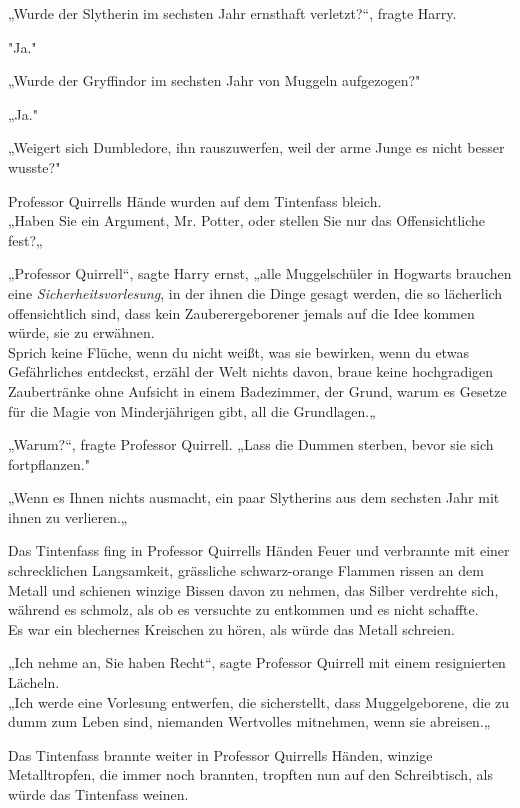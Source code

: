 {„Wurde der Slytherin im sechsten Jahr ernsthaft verletzt?“, fragte Harry.

"Ja."

„Wurde der Gryffindor im sechsten Jahr von Muggeln aufgezogen?"

„Ja."

„Weigert sich Dumbledore, ihn rauszuwerfen, weil der arme Junge es nicht besser wusste?"

Professor Quirrells Hände wurden auf dem Tintenfass bleich.\\ „Haben Sie ein Argument, Mr. Potter, oder stellen Sie nur das Offensichtliche fest?„

„Professor Quirrell“, sagte Harry ernst, „alle Muggelschüler in Hogwarts brauchen eine \emph{Sicherheitsvorlesung}, in der ihnen die Dinge gesagt werden, die so lächerlich offensichtlich sind, dass kein Zauberergeborener jemals auf die Idee kommen würde, sie zu erwähnen.\\ Sprich keine Flüche, wenn du nicht weißt, was sie bewirken, wenn du etwas Gefährliches entdeckst, erzähl der Welt nichts davon, braue keine hochgradigen Zaubertränke ohne Aufsicht in einem Badezimmer, der Grund, warum es Gesetze für die Magie von Minderjährigen gibt, all die Grundlagen.„

„Warum?“, fragte Professor Quirrell. „Lass die Dummen sterben, bevor sie sich fortpflanzen."

„Wenn es Ihnen nichts ausmacht, ein paar Slytherins aus dem sechsten Jahr mit ihnen zu verlieren.„

Das Tintenfass fing in Professor Quirrells Händen Feuer und verbrannte mit einer schrecklichen Langsamkeit, grässliche schwarz-orange Flammen rissen an dem Metall und schienen winzige Bissen davon zu nehmen, das Silber verdrehte sich, während es schmolz, als ob es versuchte zu entkommen und es nicht schaffte.\\ Es war ein blechernes Kreischen zu hören, als würde das Metall schreien.

„Ich nehme an, Sie haben Recht“, sagte Professor Quirrell mit einem resignierten Lächeln.\\ „Ich werde eine Vorlesung entwerfen, die sicherstellt, dass Muggelgeborene, die zu dumm zum Leben sind, niemanden Wertvolles mitnehmen, wenn sie abreisen.„

Das Tintenfass brannte weiter in Professor Quirrells Händen, winzige Metalltropfen, die immer noch brannten, tropften nun auf den Schreibtisch, als würde das Tintenfass weinen.

}
